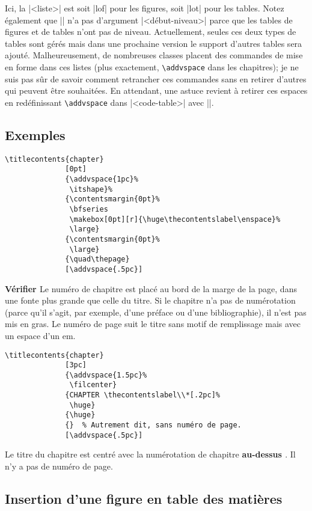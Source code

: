 \documentclass[a4paper]{ltxguide}
\newcommand{\trad}[1]{\textbf{\textcolor{orange5}{\noindent\ding{54} #1 \ding{54}}}}
\begin{document}
Ici, la |<liste>| est soit |lof| pour les figures, soit |lot| pour les tables.
Notez également que |\printlist| n'a pas d'argument |<début-niveau>| parce que
les tables de figures et de tables n'ont pas de niveau. Actuellement, seules
ces deux types de tables sont gérés mais dans une prochaine version le support
d'autres tables sera ajouté. Malheureusement, de nombreuses classes placent
des commandes de mise en forme dans ces listes (plus exactement, 
\verb|\addvspace| dans les chapitres); je ne suis pas sûr de savoir comment
retrancher ces commandes sans en retirer d'autres qui peuvent être souhaitées. 
En attendant, une astuce revient à retirer ces espaces en redéfinissant
\verb|\addvspace| dans |<code-table>| avec |\renewcommand\addvspace[1]{}|.

\subsection{Exemples}

\begin{verbatim}
\titlecontents{chapter}
              [0pt]
              {\addvspace{1pc}%
               \itshape}%
              {\contentsmargin{0pt}%
               \bfseries
               \makebox[0pt][r]{\huge\thecontentslabel\enspace}%
               \large}
              {\contentsmargin{0pt}%
               \large}
              {\quad\thepage}
              [\addvspace{.5pc}]
\end{verbatim}

\trad{Vérifier} Le numéro de chapitre est placé au bord de la marge de la
page, dans une fonte plus grande que celle du titre. Si le chapitre n'a
pas de numérotation (parce qu'il s'agit, par exemple, d'une préface ou
d'une bibliographie), il n'est pas mis en gras.  Le numéro de page suit
le titre sans motif de remplissage mais avec un espace d'un em.

\begin{verbatim}
\titlecontents{chapter}
              [3pc]
              {\addvspace{1.5pc}%
               \filcenter}
              {CHAPTER \thecontentslabel\\*[.2pc]%
               \huge}
              {\huge}
              {}  % Autrement dit, sans numéro de page.
              [\addvspace{.5pc}]
\end{verbatim}
              
Le titre du chapitre est centré avec la numérotation de chapitre 
\trad{au-dessus}. Il n'y a pas de numéro de page.

\subsection{Insertion d'une figure en table des matières}
\end{document}
